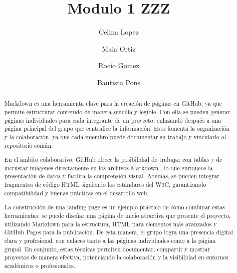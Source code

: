 \documentclass[runningheads]{llncs}
\begin{document}
%
\title{Modulo 1 ZZZ}
%
%
\author{Celina Lopez\orcidID{ } \and
Maia Ortiz\orcidID{ } \and
Rocio Gomez\orcidID{ } \and
Bautista Pons\orcidID{ }}
%
%
\institute{Universidad Nacional de Cuyo, Instituto de Ingenieria Industrisl POBOX 5502 %
\email{baupons@gmail.com}\\
\url{http://ingenieria.uncuyo.edu.ar/} %
}

%
\maketitle              %
%
\begin{abstract}
Markdown es una herramienta clave para la creación de páginas en GitHub, ya que permite estructurar contenido de manera sencilla y legible. Con ella se pueden generar páginas individuales para cada integrante de un proyecto, enlazando después a una página principal del grupo que centralice la información. Esto fomenta la organización y la colaboración, ya que cada miembro puede documentar su trabajo y vincularlo al repositorio común.

En el ámbito colaborativo, GitHub ofrece la posibilidad de trabajar con tablas y de incrustar imágenes directamente en los archivos Markdown \cite{sepulcre2024uso}, lo que enriquece la presentación de datos y facilita la comprensión visual. Además, se pueden integrar fragmentos de código HTML siguiendo los estándares del W3C, garantizando compatibilidad y buenas prácticas en el desarrollo web.

La construcción de una landing page es un ejemplo práctico de cómo combinar estas herramientas: se puede diseñar una página de inicio atractiva que presente el proyecto, utilizando Markdown para la estructura, HTML para elementos más avanzados y GitHub Pages \cite{lopez2003latex} para la publicación. De esta manera, el grupo logra una presencia digital clara y profesional, con enlaces tanto a las páginas individuales como a la página grupal. En conjunto, estas técnicas permiten documentar, compartir y mostrar proyectos de manera efectiva, potenciando la colaboración y la visibilidad en entornos académicos o profesionales.

\end{abstract}
%
%
%
\end{document}
